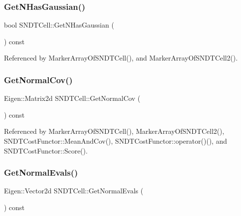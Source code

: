 \mbox{\label{classSNDTCell_ac5cc4d7ad6313adff642df9ed301cd2a}} 
\subsubsection{\texorpdfstring{Get\+N\+Has\+Gaussian()}{GetNHasGaussian()}}
{\footnotesize\ttfamily bool S\+N\+D\+T\+Cell\+::\+Get\+N\+Has\+Gaussian (\begin{DoxyParamCaption}{ }\end{DoxyParamCaption}) const\hspace{0.3cm}{\ttfamily [inline]}}



Referenced by Marker\+Array\+Of\+S\+N\+D\+T\+Cell(), and Marker\+Array\+Of\+S\+N\+D\+T\+Cell2().

\mbox{\label{classSNDTCell_ae91704f179f9c610ebeebb2fc06e1236}} 
\subsubsection{\texorpdfstring{Get\+Normal\+Cov()}{GetNormalCov()}}
{\footnotesize\ttfamily Eigen\+::\+Matrix2d S\+N\+D\+T\+Cell\+::\+Get\+Normal\+Cov (\begin{DoxyParamCaption}{ }\end{DoxyParamCaption}) const\hspace{0.3cm}{\ttfamily [inline]}}



Referenced by Marker\+Array\+Of\+S\+N\+D\+T\+Cell(), Marker\+Array\+Of\+S\+N\+D\+T\+Cell2(), S\+N\+D\+T\+Cost\+Functor\+::\+Mean\+And\+Cov(), S\+N\+D\+T\+Cost\+Functor\+::operator()(), and S\+N\+D\+T\+Cost\+Functor\+::\+Score().

\mbox{\label{classSNDTCell_aed8a9e840286d4ac69447fa25c3be2e3}} 
\subsubsection{\texorpdfstring{Get\+Normal\+Evals()}{GetNormalEvals()}}
{\footnotesize\ttfamily Eigen\+::\+Vector2d S\+N\+D\+T\+Cell\+::\+Get\+Normal\+Evals (\begin{DoxyParamCaption}{ }\end{DoxyParamCaption}) const\hspace{0.3cm}{\ttfamily [inline]}}

